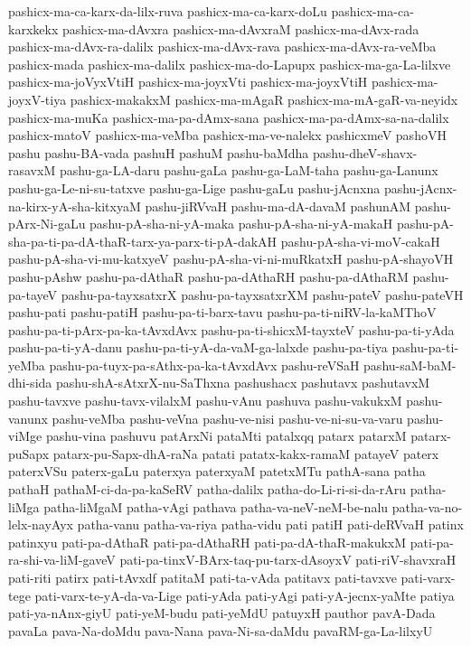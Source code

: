 {pashicx-ma-ca-karx-da-lilx-ruva
pashicx-ma-ca-karx-doLu
pashicx-ma-ca-karxkekx
pashicx-ma-dAvxra
pashicx-ma-dAvxraM
pashicx-ma-dAvx-rada
pashicx-ma-dAvx-ra-dalilx
pashicx-ma-dAvx-rava
pashicx-ma-dAvx-ra-veMba
pashicx-mada
pashicx-ma-dalilx
pashicx-ma-do-Lapupx
pashicx-ma-ga-La-lilxve
pashicx-ma-joVyxVtiH
pashicx-ma-joyxVti
pashicx-ma-joyxVtiH
pashicx-ma-joyxV-tiya
pashicx-makakxM
pashicx-ma-mAgaR
pashicx-ma-mA-gaR-va-neyidx
pashicx-ma-muKa
pashicx-ma-pa-dAmx-sana
pashicx-ma-pa-dAmx-sa-na-dalilx
pashicx-matoV
pashicx-ma-veMba
pashicx-ma-ve-nalekx
pashicxmeV
pashoVH
pashu
pashu-BA-vada
pashuH
pashuM
pashu-baMdha
pashu-dheV-shavx-rasavxM
pashu-ga-LA-daru
pashu-gaLa
pashu-ga-LaM-taha
pashu-ga-Lanunx
pashu-ga-Le-ni-su-tatxve
pashu-ga-Lige
pashu-gaLu
pashu-jAcnxna
pashu-jAcnx-na-kirx-yA-sha-kitxyaM
pashu-jiRVvaH
pashu-ma-dA-davaM
pashunAM
pashu-pArx-Ni-gaLu
pashu-pA-sha-ni-yA-maka
pashu-pA-sha-ni-yA-makaH
pashu-pA-sha-pa-ti-pa-dA-thaR-tarx-ya-parx-ti-pA-dakAH
pashu-pA-sha-vi-moV-cakaH
pashu-pA-sha-vi-mu-katxyeV
pashu-pA-sha-vi-ni-muRkatxH
pashu-pA-shayoVH
pashu-pAshw
pashu-pa-dAthaR
pashu-pa-dAthaRH
pashu-pa-dAthaRM
pashu-pa-tayeV
pashu-pa-tayxsatxrX
pashu-pa-tayxsatxrXM
pashu-pateV
pashu-pateVH
pashu-pati
pashu-patiH
pashu-pa-ti-barx-tavu
pashu-pa-ti-niRV-la-kaMThoV
pashu-pa-ti-pArx-pa-ka-tAvxdAvx
pashu-pa-ti-shicxM-tayxteV
pashu-pa-ti-yAda
pashu-pa-ti-yA-danu
pashu-pa-ti-yA-da-vaM-ga-lalxde
pashu-pa-tiya
pashu-pa-ti-yeMba
pashu-pa-tuyx-pa-sAthx-pa-ka-tAvxdAvx
pashu-reVSaH
pashu-saM-baM-dhi-sida
pashu-shA-sAtxrX-nu-SaThxna
pashushacx
pashutavx
pashutavxM
pashu-tavxve
pashu-tavx-vilalxM
pashu-vAnu
pashuva
pashu-vakukxM
pashu-vanunx
pashu-veMba
pashu-veVna
pashu-ve-nisi
pashu-ve-ni-su-va-varu
pashu-viMge
pashu-vina
pashuvu
patArxNi
pataMti
patalxqq
patarx
patarxM
patarx-puSapx
patarx-pu-Sapx-dhA-raNa
patati
patatx-kakx-ramaM
patayeV
paterx
paterxVSu
paterx-gaLu
paterxya
paterxyaM
patetxMTu
pathA-sana
patha
pathaH
pathaM-ci-da-pa-kaSeRV
patha-dalilx
patha-do-Li-ri-si-da-rAru
patha-liMga
patha-liMgaM
patha-vAgi
pathava
patha-va-neV-neM-be-nalu
patha-va-no-lelx-nayAyx
patha-vanu
patha-va-riya
patha-vidu
pati
patiH
pati-deRVvaH
patinx
patinxyu
pati-pa-dAthaR
pati-pa-dAthaRH
pati-pa-dA-thaR-makukxM
pati-pa-ra-shi-va-liM-gaveV
pati-pa-tinxV-BArx-taq-pu-tarx-dAsoyxV
pati-riV-shavxraH
pati-riti
patirx
pati-tAvxdf
patitaM
pati-ta-vAda
patitavx
pati-tavxve
pati-varx-tege
pati-varx-te-yA-da-va-Lige
pati-yAda
pati-yAgi
pati-yA-jecnx-yaMte
patiya
pati-ya-nAnx-giyU
pati-yeM-budu
pati-yeMdU
patuyxH
pauthor
pavA-Dada
pavaLa
pava-Na-doMdu
pava-Nana
pava-Ni-sa-daMdu
pavaRM-ga-La-lilxyU
}
